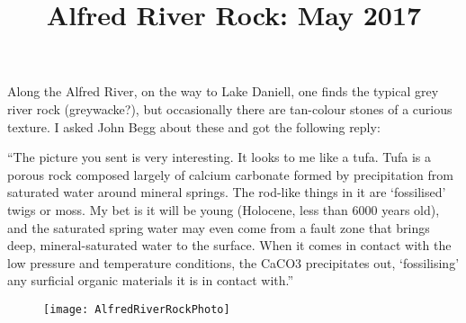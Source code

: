 \documentclass[12pt]{article} %
\title{Alfred River Rock: May 2017}
\makeatletter
\renewcommand{\maketitle}{%
  {\bfseries{\scshape{\Large{\@title\par}}}}
}
\makeatother
\begin{document}
  \maketitle

Along the Alfred River, on the way to Lake Daniell, one finds the typical grey river rock (greywacke?), but occasionally there are tan-colour stones of a curious texture.  I asked John Begg about these and got the following reply:

``The picture you sent is very interesting. It looks to me like a tufa. Tufa is a  porous rock composed largely of calcium carbonate formed by precipitation from saturated water around mineral springs. The rod-like things in it are `fossilised' twigs or moss. My bet is it will be young (Holocene,  less than 6000 years old), and the saturated spring water may even come from a fault zone that brings deep, mineral-saturated water to the surface. When it comes in contact with the low pressure and temperature conditions, the CaCO3 precipitates out, `fossilising' any surficial organic materials it is in contact with.''

\begin{figure}[hb]
\begin{center}
   \texttt{[image: AlfredRiverRockPhoto]}
\end{center}
\end{figure}
\end{document}
